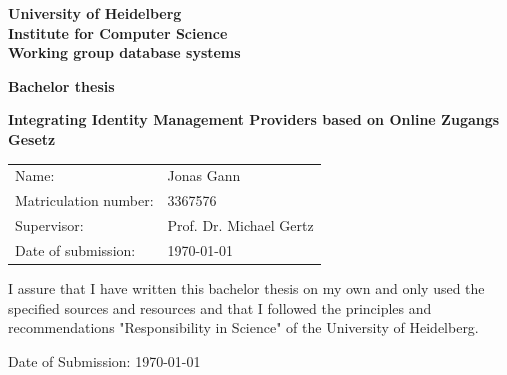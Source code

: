 \documentclass[
     12pt,         %
     a4paper,      %
     BCOR=10mm,version=first,     %
     DIV=14,version=first,        %
     ]{scrreprt}
\begin{document}
\begin{titlepage}
     \vspace*{1cm}
     \begin{center}
          \vspace*{3cm}
          \textbf
          {
               \Large University of Heidelberg\\
               \smallskip
               \Large Institute for Computer Science\\
               \smallskip
               \Large Working group database systems\\
               \smallskip
          }

          \vspace{3cm}

          \textbf{\large Bachelor thesis}

          \vspace{0.5\baselineskip}
          {
               \huge
               \textbf{Integrating Identity Management Providers based on Online Zugangs Gesetz}
          }

     \end{center}

     \vfill
     {
          \large
          \begin{tabular}[l]{ll}
               Name:                 & Jonas Gann              \\
               Matriculation number: & 3367576                 \\
               Supervisor:           & Prof. Dr. Michael Gertz \\
               Date of submission:   & \today
          \end{tabular}
     }

\end{titlepage}

\onehalfspacing

\thispagestyle{empty}

\vspace*{100pt}
\noindent
I assure that I have written this bachelor thesis on my own and only used the specified sources and resources and that I followed the principles and recommendations "Responsibility in Science" of the University of Heidelberg.

\vspace*{50pt}
\noindent

\underline{\phantom{mmmmmmmmmmmmmmmmmmmm}}

\medskip
\noindent
Date of Submission: \today
\newpage
\end{document}
